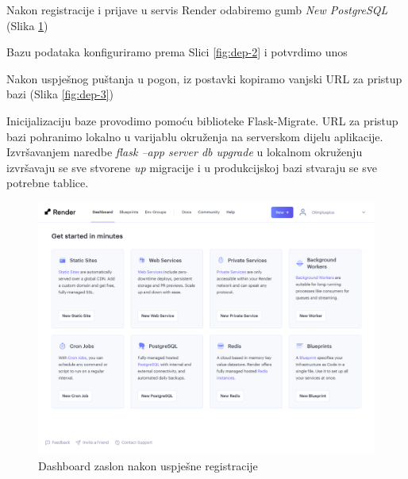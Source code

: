         \begin{packed_item}

            \item Nakon registracije i prijave u servis Render odabiremo gumb \emph{New PostgreSQL} (Slika \ref{fig:dep-1})
            \item Bazu podataka konfiguriramo prema Slici \ref{fig:dep-2} i potvrdimo unos
            \item Nakon uspješnog puštanja u pogon, iz postavki kopiramo vanjski URL za pristup bazi (Slika \ref{fig:dep-3})
            \item Inicijalizaciju baze provodimo pomoću biblioteke Flask-Migrate. URL za pristup bazi pohranimo lokalno u varijablu okruženja na serverskom dijelu aplikacije. Izvršavanjem naredbe \emph{flask --app server db upgrade} u lokalnom okruženju izvršavaju se sve stvorene \emph{up} migracije i u produkcijskoj bazi stvaraju se sve potrebne tablice.
            
        \end{packed_item}

        \begin{figure}[htp]
			\includegraphics[scale=0.17]{slike/deploy_1.png}
			\centering
			\caption{Dashboard zaslon nakon uspješne registracije}
            \label{fig:dep-1}
		\end{figure}

